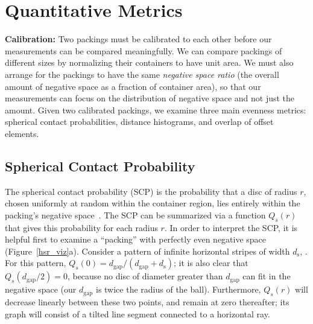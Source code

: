 \section{Quantitative Metrics}

\textbf{Calibration:}
Two packings must be calibrated to each other before our measurements 
can be compared meaningfully.  
We can compare packings of different sizes by normalizing their containers to
have unit area.  We must also arrange for the packings to have the same
\textit{negative space ratio} 
(the overall amount of negative space as a 
fraction of container area), so that our measurements can focus on the
distribution of negative space and not just the amount.  Given two
calibrated packings, we examine three main evenness metrics:
spherical contact probabilities,
distance histograms,
and overlap of offset elements. 


\subsection{Spherical Contact Probability}

The spherical contact probability (SCP) is the probability that a 
disc of radius $r$, chosen
uniformly at random within the container region, lies entirely within the 
packing's negative space~\cite{Chiu2013}.
The SCP can be summarized via a function $Q_s(r)$ that gives this 
probability for each radius $r$.
In order to interpret the SCP, it is helpful first to
examine a ``packing'' with perfectly even negative space (Figure~\ref{hsr_viz}a).
Consider a pattern of infinite horizontal stripes of width $d_\mathrm{s}$,
.  For this pattern,
$Q_s(0)=d_\mathrm{gap}/(d_\mathrm{gap}+d_\mathrm{s})$; it is also
clear that $Q_s(d_\mathrm{gap}/2)=0$, because no disc of diameter greater
than $d_\mathrm{gap}$ can fit in the negative space
(our $d_\mathrm{gap}$ is twice the radius of the ball).
Furthermore,
$Q_s(r)$ will decrease linearly between these two points, and remain
at zero thereafter; its graph will consist of a tilted line segment
connected to a horizontal ray.




